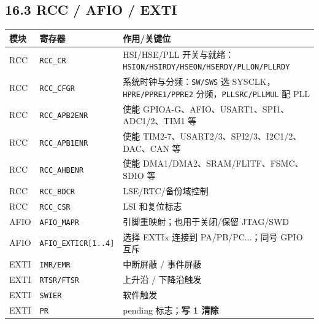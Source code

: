 \documentclass[UTF8,zihao=-5]{ctexart}
\renewcommand{\arraystretch}{0.9}
\begin{document}
\begin{multicols*}{2}
\subsection*{16.3 RCC / AFIO / EXTI}
{\scriptsize\setlength{\tabcolsep}{1.8pt}\renewcommand{\arraystretch}{0.88}%
\begin{tabularx}{\linewidth}{@{}*{3}{Y}@{}}
\toprule
\textbf{模块} & \textbf{寄存器} & \textbf{作用/关键位} \\
\midrule
RCC & \texttt{RCC\_CR} & HSI/HSE/PLL 开关与就绪：\texttt{HSION/HSIRDY/HSEON/HSERDY/PLLON/PLLRDY} \\
RCC & \texttt{RCC\_CFGR} & 系统时钟与分频：\texttt{SW/SWS} 选 SYSCLK，\texttt{HPRE/PPRE1/PPRE2} 分频，\texttt{PLLSRC/PLLMUL} 配 PLL \\
RCC & \texttt{RCC\_APB2ENR} & 使能 GPIOA-G、AFIO、USART1、SPI1、ADC1/2、TIM1 等 \\
RCC & \texttt{RCC\_APB1ENR} & 使能 TIM2-7、USART2/3、SPI2/3、I2C1/2、DAC、CAN 等 \\
RCC & \texttt{RCC\_AHBENR} & 使能 DMA1/DMA2、SRAM/FLITF、FSMC、SDIO 等 \\
RCC & \texttt{RCC\_BDCR} & LSE/RTC/备份域控制 \\
RCC & \texttt{RCC\_CSR} & LSI 和复位标志 \\
AFIO & \texttt{AFIO\_MAPR} & 引脚重映射；也用于关闭/保留 JTAG/SWD \\
AFIO & \texttt{AFIO\_EXTICR[1..4]} & 选择 EXTIx 连接到 PA/PB/PC...；同号 GPIO 互斥 \\
EXTI & \texttt{IMR/EMR} & 中断屏蔽 / 事件屏蔽 \\
EXTI & \texttt{RTSR/FTSR} & 上升沿 / 下降沿触发 \\
EXTI & \texttt{SWIER} & 软件触发 \\
EXTI & \texttt{PR} & pending 标志；\textbf{写 1 清除} \\
\bottomrule
\end{tabularx}}

\end{multicols*}
\end{document}
